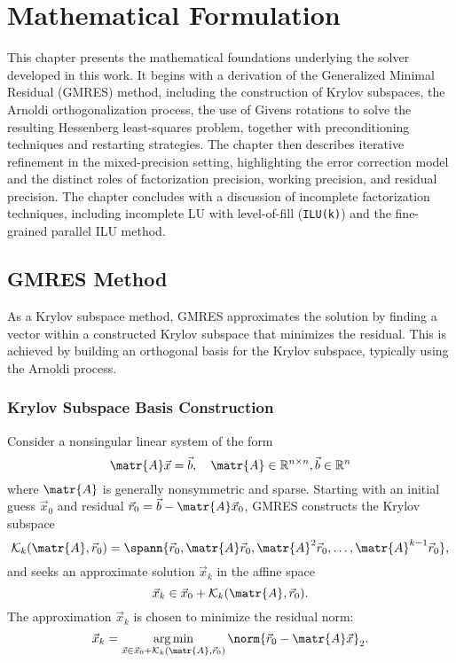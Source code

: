 \chapter{Mathematical Formulation}
\label{cha:math-form}

This chapter presents the mathematical foundations underlying the solver
developed in this work. It begins with a derivation of the Generalized Minimal
Residual (GMRES) method, including the construction of Krylov subspaces, the
Arnoldi orthogonalization process, the use of Givens rotations to solve the
resulting Hessenberg least-squares problem, together with preconditioning
techniques and restarting strategies. The chapter then describes iterative
refinement in the mixed-precision setting, highlighting the error correction
model and the distinct roles of factorization precision, working precision, and
residual precision. The chapter concludes with a discussion of incomplete
factorization techniques, including incomplete LU with level-of-fill
(\texttt{ILU(k)}) and the fine-grained parallel ILU method.

\section{GMRES Method}
\label{sec:gmres-algorithm}

As a Krylov subspace method, GMRES approximates the solution by finding a vector
within a constructed Krylov subspace that minimizes the residual. This is
achieved by building an orthogonal basis for the Krylov subspace, typically
using the Arnoldi process.

\subsection{Krylov Subspace Basis Construction}
\label{sec:kryl-subsp-basis}

Consider a nonsingular linear system of the form
\begin{equation}
  \label{eq:axb}
  \matr{A} \vec{x} = \vec{b}, \quad \matr{A} \in \mathbb{R}^{n \times n}, \vec{b} \in \mathbb{R}^n
\end{equation}
where \(\matr{A}\) is generally nonsymmetric and sparse. Starting with an
initial guess \(\vec{x}_0\) and residual \(\vec{r}_0 = \vec{b} - \matr{A}
\vec{x}_0\), GMRES constructs the Krylov subspace
\begin{equation}
  \label{eq:krylov}
  \mathcal{K}_k(\matr{A}, \vec{r}_0) = \spann{\vec{r}_0, \matr{A}\vec{r}_0, \matr{A}^2\vec{r}_0, \dots, \matr{A}^{k - 1}\vec{r}_0},
\end{equation}
and seeks an approximate solution \(\vec{x}_k\) in the affine space \[\vec{x}_k
  \in \vec{x}_0 + \mathcal{K}_k(\matr{A}, \vec{r}_0).\] The approximation
\(\vec{x}_k\) is chosen to minimize the residual norm:
\begin{equation}
  \label{eq:argmin}
  \vec{x}_k = \argmin_{\vec{x} \in \vec{x}_0 + \mathcal{K}_k(\matr{A}, \vec{r}_0)} \norm{\vec{r}_0 - \matr{A} \vec{x}}_2.
\end{equation}

